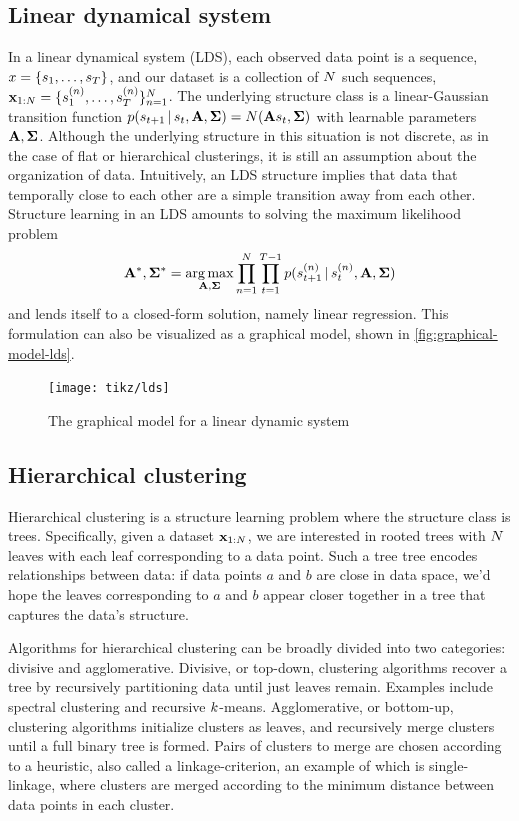 \subsection{Linear dynamical system}
In a linear dynamical system (LDS), 
each observed data point is a sequence, 
$x = \{s_1, \ldots, s_{T}\}$, and our dataset
is a collection of $N$ such sequences, $\mathbf{x}_{1:N} = \{s_1^{(n)}, \ldots, s_{T}^{(n)}\}_{n = 1}^{N}$.
The underlying structure class is
a linear-Gaussian transition function $p(s_{t + 1} \,|\, s_t, \mathbf{A}, \bm{\Sigma}) = N(\mathbf{A} s_t, \bm{\Sigma})$ with learnable parameters $\mathbf{A}, \bm{\Sigma}$.
Although the underlying structure in this situation
is not discrete, as in the case
of flat or hierarchical clusterings, it is still
an assumption about the organization of data. Intuitively,
an LDS structure implies that data that temporally
close to each other are a simple transition away from each other.
Structure learning in an LDS amounts
to solving the maximum
likelihood problem
\begin{align*}
    \mathbf{A}^*, \bm{\Sigma}^* = \operatorname*{arg\,max}_{\mathbf{A}, \bm{\Sigma}} \prod_{n = 1}^N \prod_{t = 1}^{T - 1} p(s^{(n)}_{t + 1} \,|\, s^{(n)}_t, \mathbf{A}, \bm{\Sigma})
\end{align*}
and lends itself to a closed-form solution, namely
linear regression. This formulation can also be visualized 
as a graphical model, shown in \autoref{fig:graphical-model-lds}.

\begin{figure}[htp!]
    \centering
    \texttt{[image: tikz/lds]}
    \caption{The graphical model for a linear dynamic system}
    \label{fig:graphical-model-lds}
\end{figure}

\subsection{Hierarchical clustering}
Hierarchical clustering is a structure learning problem
where the structure class is trees. Specifically,
given a dataset $\mathbf{x}_{1:N}$,
we are interested in rooted trees with $N$ leaves
with each leaf corresponding to a data point.
Such a tree tree encodes relationships between data: 
if data points $a$ and $b$ are close in data space, we'd hope
the leaves corresponding to $a$ and $b$ appear closer
together in a tree that captures the data's structure.

Algorithms for hierarchical clustering can be broadly
divided into two categories: divisive and agglomerative.
Divisive, or top-down, clustering algorithms recover a tree by recursively
partitioning data until just leaves remain. Examples
include spectral clustering \citep{} and recursive $k$-means.
Agglomerative, or bottom-up, clustering algorithms
initialize clusters as leaves, and recursively
merge clusters until a full binary tree is formed.
Pairs of clusters to merge are chosen according to
a heuristic, also called a linkage-criterion,
an example of which is single-linkage,
where clusters are merged according to the minimum
distance between data points in each cluster.

